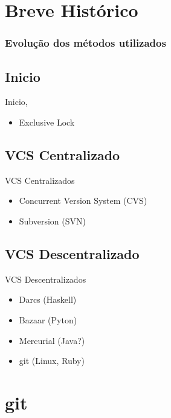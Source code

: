 \documentclass{beamer}
\begin{document}
  \section{Breve Histórico}
  \begin{frame}
    \frametitle{Evolução dos métodos utilizados}
    \subsection{Inicio}
    Inicio, 
    \begin{itemize}
      \item Exclusive Lock
    \end{itemize}

    \subsection{VCS Centralizado}
    VCS Centralizados
    \begin{itemize}
      \item Concurrent Version System (CVS)
      \item Subversion (SVN)
    \end{itemize}
    \subsection{VCS Descentralizado}
    VCS Descentralizados
    \begin{itemize}
      \item Darcs (Haskell)
      \item Bazaar (Pyton)
      \item Mercurial (Java?)
      \item git (Linux, Ruby)
    \end{itemize}
    \vfill
  \end{frame}

  \section{git}
\end{document}
